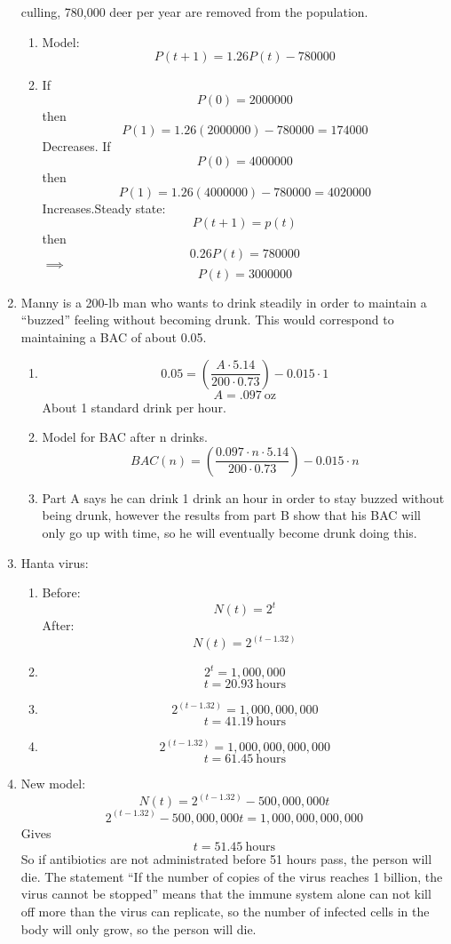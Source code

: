 \documentclass{article}
\begin{document}
\begin{enumerate}
culling, 780,000 deer per year are removed from the population.\begin{enumerate}
    \item Model: $$P(t+1)=1.26P(t)-780000$$
    \item If $$P(0)=2000000$$ then $$P(1)=1.26(2000000)-780000=174000$$ Decreases. If $$P(0)=4000000$$ then $$P(1)=1.26(4000000)-780000=4020000$$ Increases.\newline Steady state: $$P(t+1)=p(t)$$ then $$0.26P(t) = 780000$$ $\implies$ $$P(t)=3000000$$
\end{enumerate}
\item Manny is a 200-lb man who wants to drink steadily in order to maintain a ``buzzed”
feeling without becoming drunk. This would correspond to maintaining a BAC of
about 0.05.\begin{enumerate}[label=(\alph*)]
    \item $$0.05 = \left(\frac{A\cdot5.14}{200\cdot0.73}\right) - 0.015\cdot1$$ $$A=.097\ \mathrm{oz}$$ About 1 standard drink per hour.
    \item Model for BAC after n drinks. $$BAC(n) = \left(\frac{0.097\cdot n\cdot5.14}{200\cdot 0.73}\right) - 0.015\cdot n$$
    \item Part A says he can drink 1 drink an hour in order to stay buzzed without being drunk, however the results from part B show that his BAC will only go up with time, so he will eventually become drunk doing this. 
\end{enumerate}
\item Hanta virus:\begin{enumerate}[label=(\alph*)]
    \item Before: $$N(t) = 2^t$$ After: $$N(t) = 2^{(t-1.32)}$$
    \item $$2^t = 1,000,000$$  $$t = 20.93\ \mathrm{hours}$$
    \item $$2^{(t-1.32)} = 1,000,000,000$$ $$t=41.19\ \mathrm{hours}$$
    \item $$2^{(t-1.32)} = 1,000,000,000,000$$ $$t = 61.45\ \mathrm{hours}$$
\end{enumerate}
\item New model: $$ N(t) = 2^{(t-1.32)} - 500,000,000t$$ $$2^{(t-1.32)} - 500,000,000t = 1,000,000,000,000$$ Gives $$t=51.45\ \mathrm{hours}$$ So if antibiotics are not administrated before 51 hours pass, the person will die. The statement ``If the number of copies of the virus reaches 1 billion, the virus cannot be stopped'' means that the immune system alone can not kill off more than the virus can replicate, so the number of infected cells in the body will only grow, so the person will die.
\end{enumerate}
\end{document}
